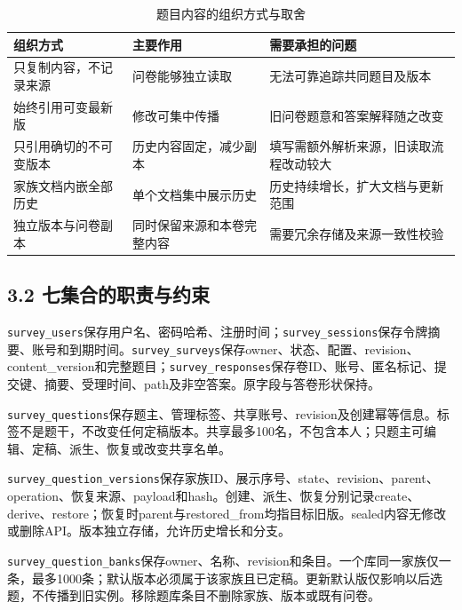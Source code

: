 \begin{table}[t]
\centering\small
\caption{题目内容的组织方式与取舍}
\label{tab:choices}
\setlength{\tabcolsep}{4pt}
\renewcommand{\arraystretch}{1.18}
\begin{tabularx}{\linewidth}{@{}>{\hsize=0.72000\hsize\raggedright\arraybackslash}X>{\hsize=0.90000\hsize\raggedright\arraybackslash}X>{\hsize=1.38000\hsize\raggedright\arraybackslash}X@{}}
\toprule
组织方式 & 主要作用 & 需要承担的问题\\
\midrule
只复制内容，不记录来源 & 问卷能够独立读取 & 无法可靠追踪共同题目及版本\\
始终引用可变最新版 & 修改可集中传播 & 旧问卷题意和答案解释随之改变\\
只引用确切的不可变版本 & 历史内容固定，减少副本 & 填写需额外解析来源，旧读取流程改动较大\\
家族文档内嵌全部历史 & 单个文档集中展示历史 & 历史持续增长，扩大文档与更新范围\\
独立版本与问卷副本 & 同时保留来源和本卷完整内容 & 需要冗余存储及来源一致性校验\\
\bottomrule
\end{tabularx}
\end{table}

\subsection{3.2 七集合的职责与约束}\label{ux4e03ux96c6ux5408ux7684ux804cux8d23ux4e0eux7ea6ux675f}

\nolinkurl{survey_users}保存用户名、密码哈希、注册时间；\nolinkurl{survey_sessions}保存令牌摘要、账号和到期时间。\nolinkurl{survey_surveys}保存owner、状态、配置、revision、content\_version和完整题目；\nolinkurl{survey_responses}保存卷ID、账号、匿名标记、提交键、摘要、受理时间、path及非空答案。原字段与答卷形状保持。

\nolinkurl{survey_questions}保存题主、管理标签、共享账号、revision及创建幂等信息。标签不是题干，不改变任何定稿版本。共享最多100名，不包含本人；只题主可编辑、定稿、派生、恢复或改变共享名单。

\nolinkurl{survey_question_versions}保存家族ID、展示序号、state、revision、parent、operation、恢复来源、payload和hash。创建、派生、恢复分别记录create、derive、restore；恢复时parent与restored\_from均指目标旧版。sealed内容无修改或删除API。版本独立存储，允许历史增长和分支。

\nolinkurl{survey_question_banks}保存owner、名称、revision和条目。一个库同一家族仅一条，最多1000条；默认版本必须属于该家族且已定稿。更新默认版仅影响以后选题，不传播到旧实例。移除题库条目不删除家族、版本或既有问卷。

